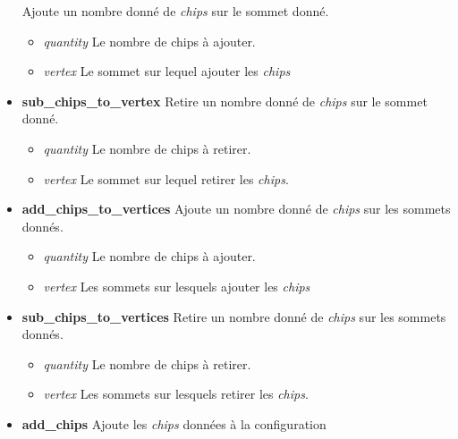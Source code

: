 \documentclass{article}
\begin{document}
\begin{itemize}
					Ajoute un nombre donné de \textit{chips} sur le sommet donné.
					\begin{itemize}
						\item \textit{quantity}\newline
						Le nombre de chips à ajouter.
						\item \textit{vertex}\newline
						Le sommet sur lequel ajouter les \textit{chips}
					\end{itemize}
					\item \textbf{sub\_chips\_to\_vertex}\newline
					Retire un nombre donné de \textit{chips} sur le sommet donné.
					\begin{itemize}
						\item \textit{quantity}\newline
						Le nombre de chips à retirer.
						\item \textit{vertex}\newline
						Le sommet sur lequel retirer les \textit{chips}.
					\end{itemize}
					\item \textbf{add\_chips\_to\_vertices}\newline
					Ajoute un nombre donné de \textit{chips} sur les sommets donnés.
					\begin{itemize}
						\item \textit{quantity}\newline
						Le nombre de chips à ajouter.
						\item \textit{vertex}\newline
						Les sommets sur lesquels ajouter les \textit{chips}
					\end{itemize}
					\item \textbf{sub\_chips\_to\_vertices}\newline
					Retire un nombre donné de \textit{chips} sur les sommets donnés.
					\begin{itemize}
						\item \textit{quantity}\newline
						Le nombre de chips à retirer.
						\item \textit{vertex}\newline
						Les sommets sur lesquels retirer les \textit{chips}.
					\end{itemize}
					\item \textbf{add\_chips}\newline
					Ajoute les \textit{chips} données à la configuration

\end{itemize}
\end{document}
